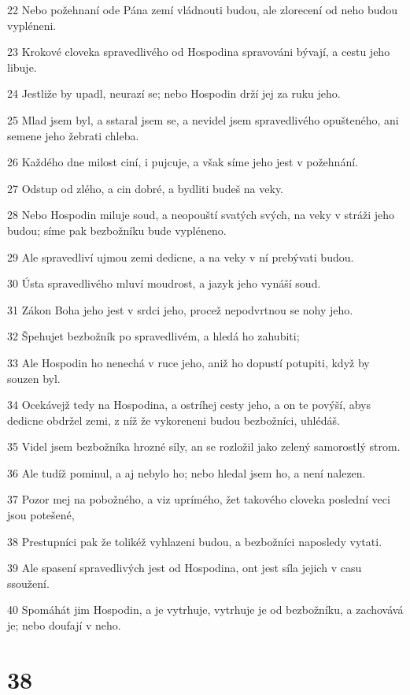 \par 22 Nebo požehnaní ode Pána zemí vládnouti budou, ale zlorecení od neho budou vypléneni.
\par 23 Krokové cloveka spravedlivého od Hospodina spravováni bývají, a cestu jeho libuje.
\par 24 Jestliže by upadl, neurazí se; nebo Hospodin drží jej za ruku jeho.
\par 25 Mlad jsem byl, a sstaral jsem se, a nevidel jsem spravedlivého opušteného, ani semene jeho žebrati chleba.
\par 26 Každého dne milost ciní, i pujcuje, a však síme jeho jest v požehnání.
\par 27 Odstup od zlého, a cin dobré, a bydliti budeš na veky.
\par 28 Nebo Hospodin miluje soud, a neopouští svatých svých, na veky v stráži jeho budou; síme pak bezbožníku bude vypléneno.
\par 29 Ale spravedliví ujmou zemi dedicne, a na veky v ní prebývati budou.
\par 30 Ústa spravedlivého mluví moudrost, a jazyk jeho vynáší soud.
\par 31 Zákon Boha jeho jest v srdci jeho, procež nepodvrtnou se nohy jeho.
\par 32 Špehujet bezbožník po spravedlivém, a hledá ho zahubiti;
\par 33 Ale Hospodin ho nenechá v ruce jeho, aniž ho dopustí potupiti, když by souzen byl.
\par 34 Ocekávejž tedy na Hospodina, a ostríhej cesty jeho, a on te povýší, abys dedicne obdržel zemi, z níž že vykoreneni budou bezbožníci, uhlédáš.
\par 35 Videl jsem bezbožníka hrozné síly, an se rozložil jako zelený samorostlý strom.
\par 36 Ale tudíž pominul, a aj nebylo ho; nebo hledal jsem ho, a není nalezen.
\par 37 Pozor mej na pobožného, a viz uprímého, žet takového cloveka poslední veci jsou potešené,
\par 38 Prestupníci pak že tolikéž vyhlazeni budou, a bezbožníci naposledy vytati.
\par 39 Ale spasení spravedlivých jest od Hospodina, ont jest síla jejich v casu ssoužení.
\par 40 Spomáhát jim Hospodin, a je vytrhuje, vytrhuje je od bezbožníku, a zachovává je; nebo doufají v neho.

\chapter{38}

